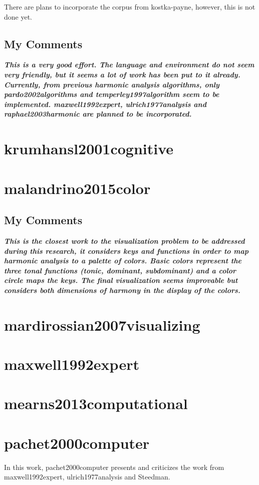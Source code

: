 		There are plans to incorporate the corpus from kostka-payne, however, this is not done yet.

		\subsection{My Comments}
		\emph{\textbf{
			This is a very good effort. The language and environment do not seem very friendly, but it seems a lot of work has been put to it already. Currently, from previous harmonic analysis algorithms, only pardo2002algorithms and temperley1997algorithm seem to be implemented. maxwell1992expert, ulrich1977analysis and raphael2003harmonic are planned to be incorporated.
		}}
	\section{krumhansl2001cognitive }
	\section{malandrino2015color }
		\subsection{My Comments}
			\emph{\textbf{
				This is the closest work to the visualization problem to be addressed during this research, it considers keys and functions in order to map harmonic analysis to a palette of colors. Basic colors represent the three tonal functions (tonic, dominant, subdominant) and a color circle maps the keys. The final visualization seems improvable but considers both dimensions of harmony in the display of the colors.
			}}
	\section{mardirossian2007visualizing }
	\section{maxwell1992expert }
	\section{mearns2013computational }
	\section{pachet2000computer }
		In this work, pachet2000computer presents and criticizes the work from maxwell1992expert, ulrich1977analysis and Steedman.
